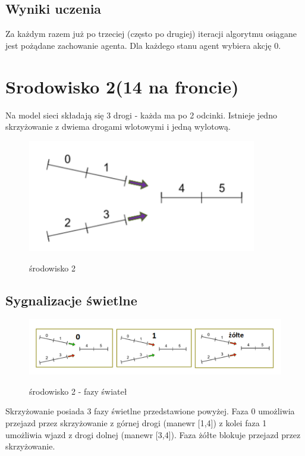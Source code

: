 \documentclass[12pt]{book}
\theoremstyle{plain}
\begin{document}
\subsection{Wyniki uczenia}
Za każdym razem już po trzeciej (często po drugiej) iteracji algorytmu osiągane jest pożądane zachowanie agenta. Dla każdego stanu agent wybiera akcję 0.

\section{Srodowisko 2(14 na froncie)}
Na model sieci składają się 3 drogi - każda ma po 2 odcinki. Istnieje jedno skrzyżowanie z dwiema drogami wlotowymi i jedną wylotową.
	\begin{figure}[H]
	\centering
	\includegraphics[width=10cm]{images/env_14}
	\label{fig:env_14}
	\caption{środowisko 2}
\end{figure}

\subsection{Sygnalizacje świetlne}	
\begin{figure}[H]
	\centering
	\includegraphics[width=17cm]{images/env_14_fazy}
	\label{fig:env_14_fazy}
	\caption{środowisko 2 - fazy świateł}
\end{figure}\noindent
Skrzyżowanie posiada 3 fazy świetlne przedstawione powyżej. Faza 0 umożliwia przejazd przez skrzyżowanie z górnej drogi (manewr [1,4]) z kolei faza 1 umożliwia wjazd z drogi dolnej (manewr [3,4]). Faza żółte blokuje przejazd przez skrzyżowanie.
\end{document}
